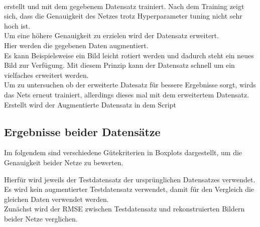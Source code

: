 \documentclass[8pt,a4paper]{article}
\begin{document}
\\

erstellt und mit dem gegebenem Datensatz trainiert.
Nach dem Training zeigt sich, dass die Genauigkeit des Netzes trotz Hyperparameter tuning nicht sehr hoch ist.\\
Um eine höhere Genauigkeit zu erzielen wird der Datensatz erweitert.\\
Hier werden die gegebenen Daten augmentiert.\\
Es kann Beispielsweise ein Bild leicht rotiert werden und dadurch steht ein neues Bild zur Verfügung.
Mit diesem Prinzip kann der Datensatz schnell um ein vielfaches erweitert werden.\\
Um zu untersuchen ob der erweiterte Datesatz für bessere Ergebnisse sorgt, wirds das Nets erneut trainiert, allerdings dieses mal mit dem erweitertem Datensatz.\\
Erstellt wird der Augmentierte Datensatz in dem Script 

\newpage
\subsection{Ergebnisse beider Datensätze}
Im folgendem sind verschiedene Gütekriterien in Boxplots dargestellt, um die Genauigkeit beider Netze zu bewerten.

Hierfür wird jeweils der Testdatensatz der ursprünglichen Datensatzes verwendet.\\
Es wird kein augmentierter Testdatensatz verwendet, damit für den Vergleich die gleichen Daten verwendet werden.\\

Zunächst wird der RMSE zwischen Testdatensatz und rekonstruierten Bildern beider Netze verglichen.\\
\end{document}
